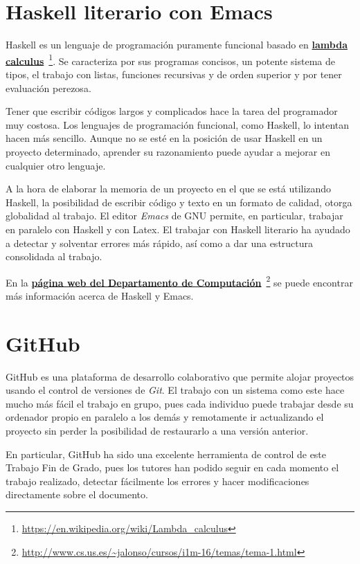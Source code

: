 \section*{Haskell literario con Emacs}

Haskell es un lenguaje de programación puramente funcional basado en 
\href{https://en.wikipedia.org/wiki/Lambda_calculus}
  {\textbf{lambda calculus}}\
  \footnote{\url{https://en.wikipedia.org/wiki/Lambda_calculus}}. Se caracteriza
por sus programas concisos, un potente sistema de tipos, el trabajo con listas,
funciones recursivas y de orden superior y por tener evaluación perezosa.

Tener que escribir códigos largos y complicados hace la tarea del programador
muy costosa. Los lenguajes de programación funcional, como Haskell, lo intentan
hacen más sencillo. Aunque no se esté en la posición de usar Haskell en un 
proyecto determinado, aprender su razonamiento puede ayudar a mejorar en 
cualquier otro lenguaje.

A la hora de elaborar la memoria de un proyecto en el que se está utilizando
Haskell, la posibilidad de escribir código y texto en un formato de calidad,
otorga globalidad al trabajo. El editor \textit{Emacs} de GNU permite, en
particular, trabajar en paralelo con Haskell y con Latex. El trabajar con
Haskell literario  ha ayudado a detectar y solventar errores más rápido, así
como a dar una estructura consolidada al trabajo. 

En la 
\href{http://www.cs.us.es/~jalonso/cursos/i1m-16/temas/tema-1.html}
  {\textbf{página web del Departamento de Computación}}\
  \footnote{\url{http://www.cs.us.es/~jalonso/cursos/i1m-16/temas/tema-1.html}}
se puede encontrar más información acerca de Haskell y Emacs.

\section*{GitHub}

GitHub es una plataforma de desarrollo colaborativo que permite alojar proyectos
usando el control de versiones de \textit{Git}. El trabajo con un sistema
como este hace mucho más fácil el trabajo en grupo, pues cada individuo puede
trabajar desde su ordenador propio en paralelo a los demás y remotamente 
ir actualizando el proyecto sin perder la posibilidad de restaurarlo a una 
versión anterior. 

En particular, GitHub ha sido una excelente herramienta de control de este 
Trabajo Fin de Grado, pues los tutores han podido seguir en cada momento el
trabajo realizado, detectar fácilmente los errores y hacer modificaciones
directamente sobre el documento.

